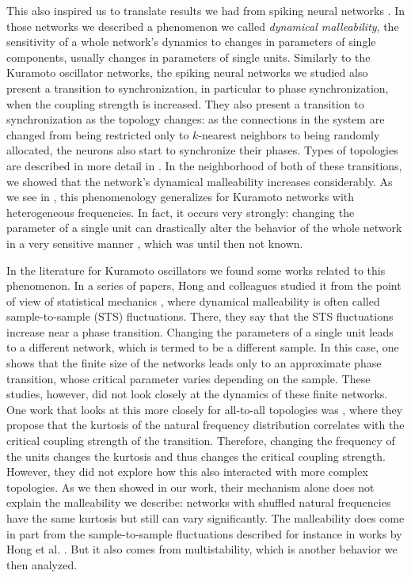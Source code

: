 This also inspired us to translate results we had from spiking neural networks \cite{budzinski2020synchronization}. In those networks we described a phenomenon we called \textit{dynamical malleability}, the sensitivity of a whole network's dynamics to changes in parameters of single components, usually changes in parameters of single units. Similarly to the Kuramoto oscillator networks, the spiking neural networks we studied also present a transition to synchronization, in particular to phase synchronization, when the coupling strength is increased. They also present a transition to synchronization as the topology changes: as the connections in the system are changed from being restricted only to $k$-nearest neighbors to being randomly allocated, the neurons also start to synchronize their phases. Types of topologies are described in more detail in . In the neighborhood of both of these transitions, we showed that the network's dynamical malleability increases considerably. As we see in , this phenomenology generalizes for Kuramoto networks with heterogeneous frequencies. In fact, it occurs very strongly: changing the parameter of a single unit can drastically alter the behavior of the whole network in a very sensitive manner \cite{rossi2022shifts}, which was until then not known. 

In the literature for Kuramoto oscillators we found some works related to this phenomenon. In a series of papers, Hong and colleagues studied it from the point of view of statistical mechanics \cite{hong2007entrainment, hong2007finitesizescalingpre}, where dynamical malleability is often called sample-to-sample (STS) fluctuations. There, they say that the STS fluctuations increase near a phase transition. Changing the parameters of a single unit leads to a different network, which is termed to be a different sample. In this case, one shows that the finite size of the networks leads only to an approximate phase transition, whose critical parameter varies depending on the sample. These studies, however, did not look closely at the dynamics of these finite networks. One work that looks at this more closely for all-to-all topologies was , where they propose that the kurtosis of the natural frequency distribution correlates with the critical coupling strength of the transition. Therefore, changing the frequency of the units changes the kurtosis and thus changes the critical coupling strength. However, they did not explore how this also interacted with more complex topologies. As we then showed in our work, their mechanism alone does not explain the malleability we describe: networks with shuffled natural frequencies have the same kurtosis but still can vary significantly. The malleability does come in part from the sample-to-sample fluctuations described for instance in works by Hong et al. \cite{hong2007entrainment}. But it also comes from multistability, which is another behavior we then analyzed. 

